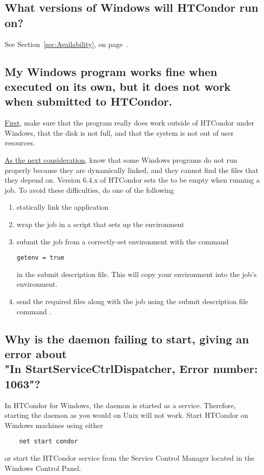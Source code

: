 \subsection*{What versions of Windows will HTCondor run on?}

See Section~\ref{sec:Availability}, on
page~\pageref{sec:Availability}.


\subsection*{My Windows program works fine when executed on its own, but it
does not work when submitted to HTCondor.}

\underline{First}, make sure that the program really does work
outside of HTCondor under Windows,
that the disk is not full,
and that the system is not out of user resources.

\underline{As the next consideration},
know that 
some Windows programs do not run properly because they are dynamically linked,
and they cannot find the  files that they depend on.
Version 6.4.x of HTCondor sets the  to be empty when
running a job.
To avoid these difficulties, do one of the following
\begin{enumerate}
\item statically link the application
\item wrap the job in a script that sets up the environment
\item submit the job from a correctly-set environment with the command
\begin{verbatim}
getenv = true
\end{verbatim}
in the submit description file.
This will copy your environment into the job's environment.
\item send the required  files along with the job
using the submit description file command .
\end{enumerate}


\subsection*{Why is the  daemon failing to start, giving an error about\\
   	"In StartServiceCtrlDispatcher, Error number: 1063"?}
In HTCondor for Windows, the  daemon is started as a service.
Therefore,
starting the  daemon as you would on Unix will not work.
Start HTCondor on Windows machines using either
\begin{verbatim}
	net start condor
\end{verbatim}
or start the HTCondor service from the Service Control Manager located in
the Windows Control Panel.

